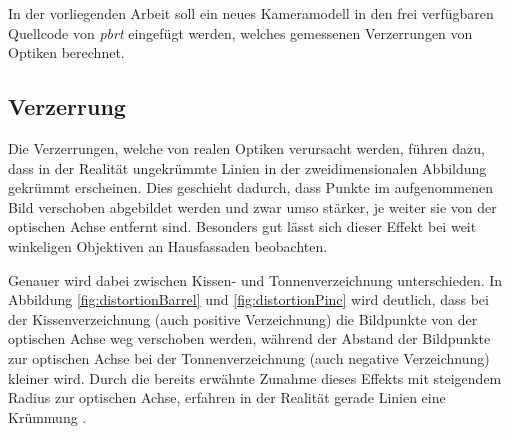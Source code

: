 In der vorliegenden Arbeit soll ein neues Kameramodell in den frei verfügbaren Quellcode von \textit{pbrt} eingefügt werden, welches gemessenen Verzerrungen von Optiken berechnet.

\subsection{Verzerrung}

Die Verzerrungen, welche von realen Optiken verursacht werden, führen dazu, dass in der Realität ungekrümmte Linien in der zweidimensionalen Abbildung gekrümmt erscheinen. Dies geschieht dadurch, dass Punkte im aufgenommenen Bild verschoben abgebildet werden und zwar umso stärker, je weiter sie von der optischen Achse entfernt sind. Besonders gut lässt sich dieser Effekt bei weit winkeligen Objektiven an Hausfassaden beobachten. 

Genauer wird dabei zwischen Kissen- und Tonnenverzeichnung unterschieden. In Abbildung \ref{fig:distortionBarrel} und \ref{fig:distortionPinc} wird deutlich, dass bei der Kissenverzeichnung (auch positive Verzeichnung) die Bildpunkte von der optischen Achse weg verschoben werden, während der Abstand der Bildpunkte zur optischen Achse bei der Tonnenverzeichnung (auch negative Verzeichnung) kleiner wird. Durch die bereits erwähnte Zunahme dieses Effekts mit steigendem Radius zur optischen Achse, erfahren in der Realität gerade Linien eine Krümmung \cite{smith2000modern}.

